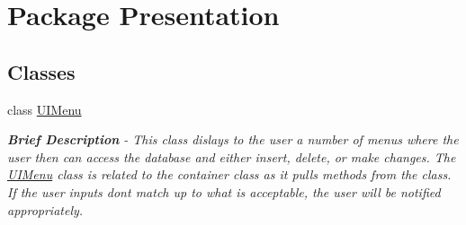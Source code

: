 \hypertarget{namespace_presentation}{}\section{Package Presentation}
\label{namespace_presentation}
\subsection*{Classes}
\begin{DoxyCompactItemize}
\item 
class \hyperlink{class_presentation_1_1_u_i_menu}{U\+I\+Menu}
\begin{DoxyCompactList}\small\item\em {\bfseries Brief Description} -\/ This class dislays to the user a number of menus where the user then can access the database and either insert, delete, or make changes. The \hyperlink{class_presentation_1_1_u_i_menu}{U\+I\+Menu} class is related to the container class as it pulls methods from the class. If the user inputs don\textquotesingle{}t match up to what is acceptable, the user will be notified appropriately. \end{DoxyCompactList}\end{DoxyCompactItemize}
